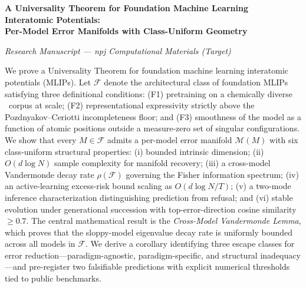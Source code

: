 \documentclass[11pt,a4paper]{article}
\theoremstyle{plain}
\theoremstyle{definition}
\newcommand{\DFT}{\text{DFT}}
\newcommand{\cM}{\mathcal{M}}
\newcommand{\cF}{\mathcal{F}}
\begin{document}
\begin{center}
\LARGE\bfseries
A Universality Theorem for Foundation Machine Learning\\[0.3em]
Interatomic Potentials:\\[0.3em]
Per-Model Error Manifolds with Class-Uniform Geometry
\end{center}

\vspace{1em}
\begin{center}
\textit{Research Manuscript --- npj Computational Materials (Target)}
\end{center}

\vspace{1.5em}

\begin{tcolorbox}[colback=gray!5,colframe=gray!40,title=\textbf{Abstract},fonttitle=\bfseries,boxrule=0.5pt]
We prove a Universality Theorem for foundation machine learning interatomic potentials (MLIPs). Let $\cF$ denote the architectural class of foundation MLIPs satisfying three definitional conditions: (F1) pretraining on a chemically diverse \DFT\ corpus at scale; (F2) representational expressivity strictly above the Pozdnyakov--Ceriotti incompleteness floor; and (F3) smoothness of the model as a function of atomic positions outside a measure-zero set of singular configurations. We show that every $M \in \cF$ admits a per-model error manifold $\cM(M)$ with six class-uniform structural properties: (i) bounded intrinsic dimension; (ii) $O(d \log N)$ sample complexity for manifold recovery; (iii) a cross-model Vandermonde decay rate $\rho(\cF)$ governing the Fisher information spectrum; (iv) an active-learning excess-risk bound scaling as $O(d \log N / T)$; (v) a two-mode inference characterization distinguishing prediction from refusal; and (vi) stable evolution under generational succession with top-error-direction cosine similarity $\geq 0.7$. The central mathematical result is the \emph{Cross-Model Vandermonde Lemma}, which proves that the sloppy-model eigenvalue decay rate is uniformly bounded across all models in $\cF$. We derive a corollary identifying three escape classes for error reduction---paradigm-agnostic, paradigm-specific, and structural inadequacy---and pre-register two falsifiable predictions with explicit numerical thresholds tied to public benchmarks.
\end{tcolorbox}
\end{document}
